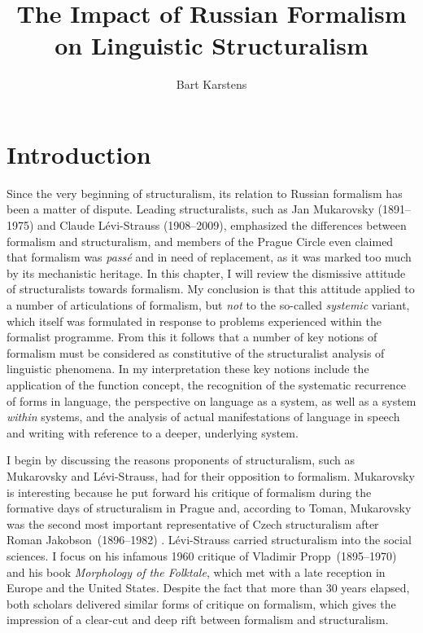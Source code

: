 \documentclass[output=paper]{langscibook}
\author{Bart Karstens \affiliation{Vrije Universiteit Amsterdam}}
\title{The Impact of Russian Formalism on Linguistic Structuralism}
\begin{document}
\maketitle

\section{Introduction} 
\label{sec:karstens:intro}

Since the very beginning of structuralism, its relation to Russian formalism has been a matter of dispute. Leading structuralists, such as Jan Mukarovsky (1891--1975) and Claude Lévi-Strauss (1908--2009), emphasized the differences between formalism and structuralism, and members of the Prague Circle even claimed that formalism was \emph{passé} and in need of replacement, as it was marked too much by its mechanistic heritage. In this chapter, I will review the dismissive attitude of structuralists towards formalism. My conclusion is that this attitude applied to a number of articulations of formalism, but \emph{not} to the so-called \emph{systemic} variant, which itself was formulated in response to problems experienced within the formalist programme. From this it follows that a number of key notions of formalism must be considered as constitutive of the structuralist analysis of linguistic phenomena. In my interpretation these key notions include the application of the function concept, the recognition of the systematic recurrence of forms in language, the perspective on language as a system, as well as a system \emph{within} systems, and the analysis of actual manifestations of language in speech and writing with reference to a deeper, underlying system.

I begin by discussing the reasons proponents of structuralism, such as Mukarovsky and Lévi-Strauss, had for their opposition to formalism. Mukarovsky is interesting because he put forward his critique of formalism during the formative days of structuralism in Prague and, according to Toman, Mukarovsky was the second most important representative of Czech structuralism after Roman Jakobson~(1896--1982) \citep[128]{Toman1995}. Lévi-Strauss carried structuralism into the social sciences. I focus on his infamous 1960 critique of Vladimir Propp~(1895--1970) and his \citeyear{Propp1928} book \emph{Morphology of the Folktale}, which met with a late reception in Europe and the United States. Despite the fact that more than 30 years elapsed, both scholars delivered similar forms of critique on formalism, which gives the impression of a clear-cut and deep rift between formalism and structuralism.  
\end{document}
